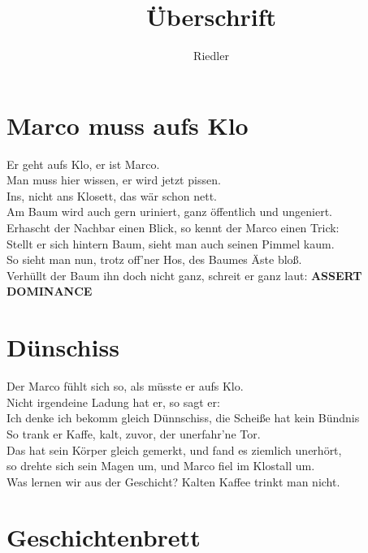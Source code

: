 \documentclass[11pt]{article}
\title{\textbf{Überschrift}}
\author{Riedler}
\date{}
\begin{document}
\maketitle
\thispagestyle{empty}

\section*{Marco muss aufs Klo}

Er geht aufs Klo, er ist Marco.\\
Man muss hier wissen, er wird jetzt pissen.\\
Ins, nicht ans Klosett, das wär schon nett.\\
Am Baum wird auch gern uriniert, ganz öffentlich und ungeniert.\\
Erhascht der Nachbar einen Blick, so kennt der Marco einen Trick:\\
Stellt er sich hintern Baum, sieht man auch seinen Pimmel kaum.\\
So sieht man nun, trotz off'ner Hos, des Baumes Äste bloß.\\
Verhüllt der Baum ihn doch nicht ganz, schreit er ganz laut: \textbf{ASSERT DOMINANCE}

\section*{Dünschiss}

Der Marco fühlt sich so, als müsste er aufs Klo.\\
Nicht irgendeine Ladung hat er, so sagt er:\\
Ich denke ich bekomm gleich Dünnschiss, die Scheiße hat kein Bündnis\\
So trank er Kaffe, kalt, zuvor, der unerfahr'ne Tor.\\
Das hat sein Körper gleich gemerkt, und fand es ziemlich unerhört,\\
so drehte sich sein Magen um, und Marco fiel im Klostall um.\\
Was lernen wir aus der Geschicht? Kalten Kaffee trinkt man nicht.

\section*{Geschichtenbrett}
\end{document}
